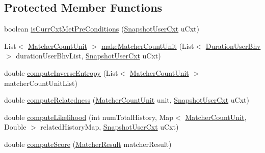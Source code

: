 \subsection*{\-Protected \-Member \-Functions}
\begin{DoxyCompactItemize}
\item 
boolean \hyperlink{classlab_1_1davidahn_1_1appshuttle_1_1predict_1_1matcher_1_1headset_1_1_headset_matcher_ae48f8458dcd595bef643032aa21e6c5b}{is\-Curr\-Cxt\-Met\-Pre\-Conditions} (\hyperlink{classlab_1_1davidahn_1_1appshuttle_1_1collect_1_1_snapshot_user_cxt}{\-Snapshot\-User\-Cxt} u\-Cxt)
\item 
\-List$<$ \hyperlink{classlab_1_1davidahn_1_1appshuttle_1_1predict_1_1matcher_1_1_matcher_count_unit}{\-Matcher\-Count\-Unit} $>$ \hyperlink{classlab_1_1davidahn_1_1appshuttle_1_1predict_1_1matcher_1_1headset_1_1_headset_matcher_ad137a2493e7da2a7f92289ef6135c26d}{make\-Matcher\-Count\-Unit} (\-List$<$ \hyperlink{classlab_1_1davidahn_1_1appshuttle_1_1collect_1_1bhv_1_1_duration_user_bhv}{\-Duration\-User\-Bhv} $>$ duration\-User\-Bhv\-List, \hyperlink{classlab_1_1davidahn_1_1appshuttle_1_1collect_1_1_snapshot_user_cxt}{\-Snapshot\-User\-Cxt} u\-Cxt)
\item 
double \hyperlink{classlab_1_1davidahn_1_1appshuttle_1_1predict_1_1matcher_1_1headset_1_1_headset_matcher_a15755aaf21a30d5367d623271757c67c}{compute\-Inverse\-Entropy} (\-List$<$ \hyperlink{classlab_1_1davidahn_1_1appshuttle_1_1predict_1_1matcher_1_1_matcher_count_unit}{\-Matcher\-Count\-Unit} $>$ matcher\-Count\-Unit\-List)
\item 
double \hyperlink{classlab_1_1davidahn_1_1appshuttle_1_1predict_1_1matcher_1_1headset_1_1_headset_matcher_a3a8f69593f8b801b594291ec8c078d32}{compute\-Relatedness} (\hyperlink{classlab_1_1davidahn_1_1appshuttle_1_1predict_1_1matcher_1_1_matcher_count_unit}{\-Matcher\-Count\-Unit} unit, \hyperlink{classlab_1_1davidahn_1_1appshuttle_1_1collect_1_1_snapshot_user_cxt}{\-Snapshot\-User\-Cxt} u\-Cxt)
\item 
double \hyperlink{classlab_1_1davidahn_1_1appshuttle_1_1predict_1_1matcher_1_1headset_1_1_headset_matcher_a40725c547b72bb7adfa530ba10889392}{compute\-Likelihood} (int num\-Total\-History, \-Map$<$ \hyperlink{classlab_1_1davidahn_1_1appshuttle_1_1predict_1_1matcher_1_1_matcher_count_unit}{\-Matcher\-Count\-Unit}, \-Double $>$ related\-History\-Map, \hyperlink{classlab_1_1davidahn_1_1appshuttle_1_1collect_1_1_snapshot_user_cxt}{\-Snapshot\-User\-Cxt} u\-Cxt)
\item 
double \hyperlink{classlab_1_1davidahn_1_1appshuttle_1_1predict_1_1matcher_1_1headset_1_1_headset_matcher_a649ea089f5ed21991e19920131d51243}{compute\-Score} (\hyperlink{classlab_1_1davidahn_1_1appshuttle_1_1predict_1_1matcher_1_1_matcher_result}{\-Matcher\-Result} matcher\-Result)
\end{DoxyCompactItemize}


